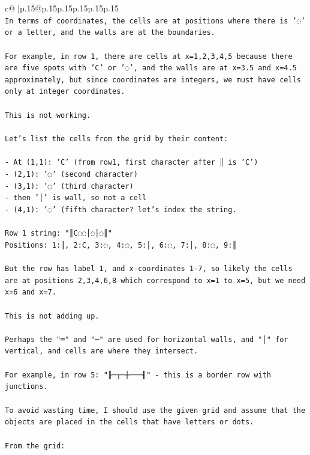 \documentclass{article}
\begin{document}
{\begin{supertabular}{c@{$\;$}|p{.15\linewidth}@{}p{.15\linewidth}p{.15\linewidth}p{.15\linewidth}p{.15\linewidth}p{.15\linewidth}}
{{{\\ 
\texttt{In terms of coordinates, the cells are at positions where there is '◌' or a letter, and the walls are at the boundaries.} \\
\\ 
\texttt{For example, in row 1, there are cells at x=1,2,3,4,5 because there are five spots with 'C' or '◌', and the walls are at x=3.5 and x=4.5 approximately, but since coordinates are integers, we must have cells only at integer coordinates.} \\
\\ 
\texttt{This is not working.} \\
\\ 
\texttt{Let's list the cells from the grid by their content:} \\
\\ 
\texttt{{-} At (1,1): 'C'  (from row1, first character after ║ is 'C')} \\
\texttt{{-} (2,1): '◌' (second character)} \\
\texttt{{-} (3,1): '◌' (third character)} \\
\texttt{{-} then '│' is wall, so not a cell} \\
\texttt{{-} (4,1): '◌' (fifth character? let's index the string.} \\
\\ 
\texttt{Row 1 string: "║C◌◌│◌│◌║"} \\
\texttt{Positions: 1:║, 2:C, 3:◌, 4:◌, 5:│, 6:◌, 7:│, 8:◌, 9:║} \\
\\ 
\texttt{But the row has label 1, and x{-}coordinates 1{-}7, so likely the cells are at positions 2,3,4,6,8 which correspond to x=1 to x=5, but we need x=6 and x=7.} \\
\\ 
\texttt{This is not adding up.} \\
\\ 
\texttt{Perhaps the "═" and "─" are used for horizontal walls, and "│" for vertical, and cells are where they intersect.} \\
\\ 
\texttt{For example, in row 5: "╟─┬─┼───╢" {-} this is a border row with junctions.} \\
\\ 
\texttt{To avoid wasting time, I should use the given grid and assume that the objects are placed in the cells that have letters or dots.} \\
\\ 
\texttt{From the grid:} \\
}}}
\end{supertabular}}
\end{document}
